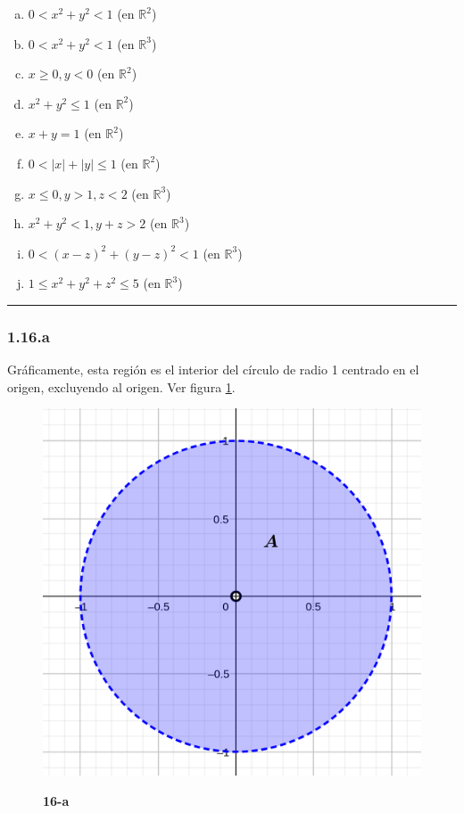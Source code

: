 \documentclass{article}
\renewcommand{\Bbb}{\mathbb}
\begin{document}
\begin{enumerate}[(a)]
\bfseries
\item $0 < x^2 + y^2 < 1$ (en $\Bbb R^2$)

\item $0 < x^2 + y^2 < 1$ (en $\Bbb R^3$)

\item $x \geq 0, y < 0$ (en $\Bbb R^2$)

\item $x^2 + y^2 \leq 1$ (en $\Bbb R^2$)

\item $x + y = 1$ (en $\Bbb R^2$)

\item $0 < |x| + |y| \leq 1$ (en $\Bbb R^2$)

\item $x \leq 0, y > 1, z<2$ (en $\Bbb R^3$)

\item $x^2 + y^2 <1, y + z > 2$ (en $\Bbb R^3$)

\item $0 < (x-z)^2 + (y-z)^2 < 1$ (en $\Bbb R^3$)

\item $1 \leq x^2 + y^2 + z^2 \leq 5$ (en $\Bbb R^3$)
\end{enumerate}
\hrule

\subsubsection*{1.16.a}
\label{subsubsec:1.16.a}

Gráficamente, esta región es el interior del círculo de radio 1 centrado en el origen, excluyendo al origen. Ver figura \ref{fig:1-16-a}.

\begin{figure}[ht]
\caption{\textbf{16-a}}
\includegraphics[scale=2.5]{img/ejercicios/1/16-a.png} 
\centering
\label{fig:1-16-a}
\end{figure}
\end{document}
